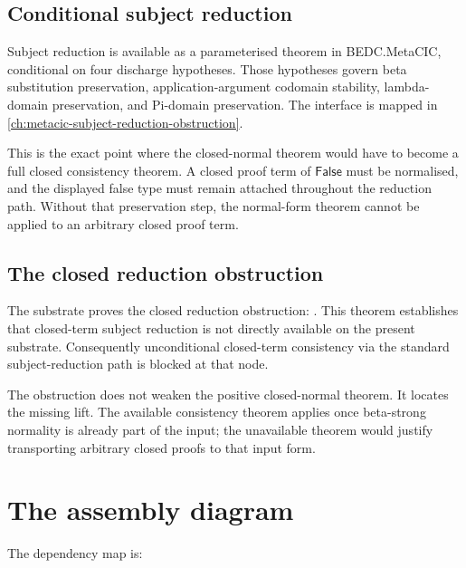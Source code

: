\subsection{Conditional subject reduction}
\label{subsec:closed-metacic-consistency-assembly-conditional-sr}

Subject reduction is available as a parameterised theorem in BEDC.MetaCIC,
conditional on four discharge hypotheses. Those hypotheses govern beta
substitution preservation, application-argument codomain stability,
lambda-domain preservation, and Pi-domain preservation. The interface is mapped
in \autoref{ch:metacic-subject-reduction-obstruction}.

This is the exact point where the closed-normal theorem would have to become a
full closed consistency theorem. A closed proof term of $\mathsf{False}$ must be
normalised, and the displayed false type must remain attached throughout the
reduction path. Without that preservation step, the normal-form theorem cannot
be applied to an arbitrary closed proof term.

\subsection{The closed reduction obstruction}
\label{subsec:closed-metacic-consistency-assembly-reduction-obstruction}

The substrate proves the closed reduction obstruction:
.
This theorem establishes that closed-term subject reduction is not directly
available on the present substrate. Consequently unconditional closed-term
consistency via the standard subject-reduction path is blocked at that node.

The obstruction does not weaken the positive closed-normal theorem. It locates
the missing lift. The available consistency theorem applies once beta-strong
normality is already part of the input; the unavailable theorem would justify
transporting arbitrary closed proofs to that input form.

\section{The assembly diagram}
\label{sec:closed-metacic-consistency-assembly-diagram}

The dependency map is:

